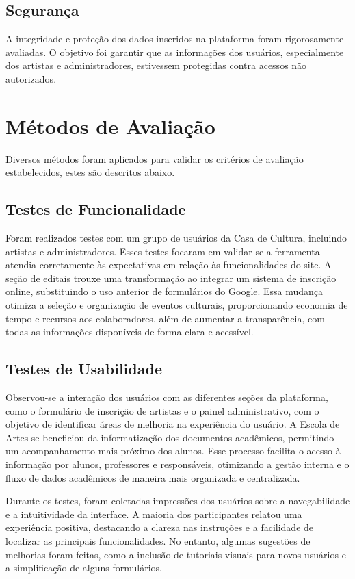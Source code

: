 \subsection{Segurança} 
A integridade e proteção dos dados inseridos na plataforma foram rigorosamente avaliadas. O objetivo foi garantir que as informações dos usuários, especialmente dos artistas e administradores, estivessem protegidas contra acessos não autorizados.

\section{Métodos de Avaliação}

Diversos métodos foram aplicados para validar os critérios de avaliação estabelecidos, estes são descritos abaixo.

\subsection{Testes de Funcionalidade} 

Foram realizados testes com um grupo de usuários da Casa de Cultura, incluindo artistas e administradores. Esses testes focaram em validar se a ferramenta atendia corretamente às expectativas em relação às funcionalidades do site. A seção de editais trouxe uma transformação ao integrar um sistema de inscrição online, substituindo o uso anterior de formulários do Google. Essa mudança otimiza a seleção e organização de eventos culturais, proporcionando economia de tempo e recursos aos colaboradores, além de aumentar a transparência, com todas as informações disponíveis de forma clara e acessível.

\subsection{Testes de Usabilidade}

Observou-se a interação dos usuários com as diferentes seções da plataforma, como o formulário de inscrição de artistas e o painel administrativo, com o objetivo de identificar áreas de melhoria na experiência do usuário. A Escola de Artes se beneficiou da informatização dos documentos acadêmicos, permitindo um acompanhamento mais próximo dos alunos. Esse processo facilita o acesso à informação por alunos, professores e responsáveis, otimizando a gestão interna e o fluxo de dados acadêmicos de maneira mais organizada e centralizada.

Durante os testes, foram coletadas impressões dos usuários sobre a navegabilidade e a intuitividade da interface. A maioria dos participantes relatou uma experiência positiva, destacando a clareza nas instruções e a facilidade de localizar as principais funcionalidades. No entanto, algumas sugestões de melhorias foram feitas, como a inclusão de tutoriais visuais para novos usuários e a simplificação de alguns formulários.

